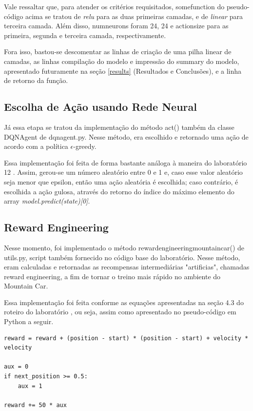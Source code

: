 \documentclass[conference]{IEEEtran}
\begin{document}
	Vale ressaltar que, para atender os critérios requisitados, some\underline{\space}function do pseudo-código acima se tratou de \textit{relu} para as duas primeiras camadas, e de \textit{linear} para terceira camada. Além disso, num\underline{\space}neurons foram 24, 24 e action\underline{\space}size para as primeira, segunda e terceira camada, respectivamente.

	Fora isso, bastou-se descomentar as linhas de criação de uma pilha linear de camadas, as linhas compilação do modelo e impressão do summary do modelo, apresentado futuramente na seção \ref{results} (Resultados e Conclusões), e a linha de retorno da função.

	\subsection{Escolha de Ação usando Rede Neural}

	Já essa etapa se tratou da implementação do método act() também da classe DQNAgent de dqn\underline{\space}agent.py. Nesse método, era escolhido e retornado uma ação de acordo com a política $\epsilon$-greedy.
	
	Essa implementação foi feita de forma bastante análoga à maneira do laboratório 12 \cite{roteiro12}. Assim, gerou-se um número aleatório entre 0 e 1 e, caso esse valor aleatório seja menor que epsilon, então uma ação aleatória é escolhida; caso contrário, é escolhida a ação gulosa, através do retorno do índice do máximo elemento do array \textit{model.predict(state)[0]}.
		
	\subsection{Reward Engineering}
	
	Nesse momento, foi implementado o método reward\underline{\space}engineering\underline{\space}mountain\underline{\space}car() de utils.py, script também fornecido no código base do laboratório. Nesse método, eram calculadas e retornadas as recompensas intermediárias "artificias", chamadas reward engineering, a fim de tornar o treino mais rápido no ambiente do Mountain Car.
	
	Essa implementação foi feita conforme as equações apresentadas na seção 4.3 do roteiro do laboratório \cite{roteiro}, ou seja, assim como apresentado no pseudo-código em Python a seguir.
	
\begin{lstlisting}
reward = reward + (position - start) * (position - start) + velocity * velocity

aux = 0
if next_position >= 0.5:
    aux = 1

reward += 50 * aux
\end{lstlisting}
\end{document}
